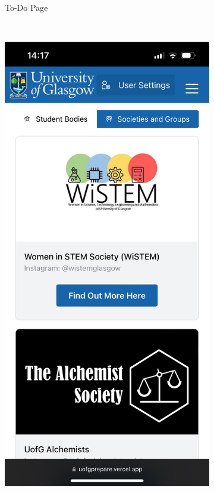 \documentclass{l4proj}
\begin{document}
\begin{figure}[ht]
\begin{subfigure}[b]{0.3\textwidth}
        \caption{To-Do Page}
        \label{fig:mobileToDo}
    \end{subfigure}
    ~ %
    \begin{subfigure}[b]{0.3\textwidth}
        \includegraphics[width=\textwidth]{images/mobileExtra.pdf}

\end{subfigure}
\end{figure}
\end{document}
